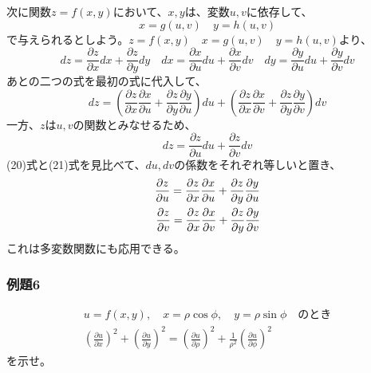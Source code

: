 \documentclass[a4j,dvipdfmx]{jsarticle}
\begin{document}
次に関数$z=f(x,y)$において、$x,y$は、変数$u,v$に依存して、
\begin{equation}
    x=g(u,v)\quad y=h(u,v)
\end{equation}
で与えられるとしよう。$z=f(x,y)\quad x=g(u,v)\quad y=h(u,v)$より、
\begin{equation}
    dz=\frac{\partial z}{\partial x}dx+\frac{\partial z}{\partial y}dy\quad dx=\frac{\partial x}{\partial u}du+\frac{\partial x}{\partial v}dv\quad dy=\frac{\partial y}{\partial u}du+\frac{\partial y}{\partial v}dv
\end{equation}
あとの二つの式を最初の式に代入して、
\begin{equation}
    dz=\left(\frac{\partial z}{\partial x}\frac{\partial x}{\partial u}+\frac{\partial z}{\partial y}\frac{\partial y}{\partial u}\right)du+\left(\frac{\partial z}{\partial x}\frac{\partial x}{\partial v}+\frac{\partial z}{\partial y}\frac{\partial y}{\partial v}\right)dv
\end{equation}
一方、$z$は$u,v$の関数とみなせるため、
\begin{equation}
    dz=\frac{\partial z}{\partial u}du+\frac{\partial z}{\partial v}dv
\end{equation}
(20)式と(21)式を見比べて、$du,dv$の係数をそれぞれ等しいと置き、
\begin{align}
    \frac{\partial z}{\partial u}=\frac{\partial z}{\partial x}\frac{\partial x}{\partial u}+\frac{\partial z}{\partial y}\frac{\partial y}{\partial u}\notag\\
    \frac{\partial z}{\partial v}=\frac{\partial z}{\partial x}\frac{\partial x}{\partial v}+\frac{\partial z}{\partial y}\frac{\partial y}{\partial v}
\end{align}
これは多変数関数にも応用できる。
\subsubsection*{例題6}
\begin{align*}
    u=f(x,y),\quad x=\rho\cos \phi,\quad y=\rho\sin \phi\quad\text{のとき}\\
    \left(\frac{\partial u}{\partial x}\right)^2+\left(\frac{\partial u}{\partial y}\right)^2=\left(\frac{\partial u}{\partial \rho}\right)^2+\frac{1}{\rho^2}\left(\frac{\partial u}{\partial \phi}\right)^2
\end{align*}
を示せ。
\end{document}
